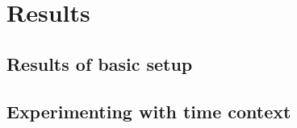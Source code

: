 \section{Results}
\label{sec:results}

\subsection{Results of basic setup}

\subsection{Experimenting with time context}



